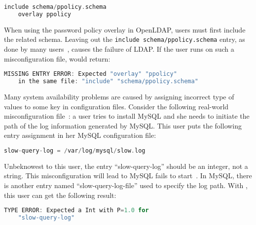 \begin{lstlisting}[language=C, xleftmargin=.01\textwidth]
    include schema/ppolicy.schema
    overlay ppolicy
\end{lstlisting} 

When using the password policy overlay in OpenLDAP, 
users must first include the related schema.
Leaving out the {\tt include schema/ppolicy.schema} entry, 
as done by many users~\cite{yin11anempirical}, 
causes the failure of LDAP. 
If the user runs \app on such a misconfiguration file,
\app would return:

\begin{lstlisting}[language=C, xleftmargin=.01\textwidth]
    MISSING ENTRY ERROR: Expected "overlay" "ppolicy"
    in the same file: "include" "schema/ppolicy.schema"
\end{lstlisting} 

Many system availability problems are caused by 
assigning incorrect type of values to some key in configuration
files. Consider the following real-world misconfiguration
file~\cite{typeerror}: 
a user tries to install MySQL and she needs to initiate the path
of the log information generated by MySQL.
This user puts the following entry assignment in her MySQL
configuration file: 

\begin{lstlisting}[language=C, xleftmargin=.01\textwidth]
    slow-query-log = /var/log/mysql/slow.log
\end{lstlisting} 

Unbeknowest to this user, the entry ``slow-query-log'' should be an 
integer, not a string. This misconfiguration will lead to 
MySQL fails to start~\cite{querylog}. In MySQL, there is another entry 
named ``slow-query-log-file'' used to specify the log path.
With \app, this user can get the following result:

\begin{lstlisting}[language=C, xleftmargin=.01\textwidth]
    TYPE ERROR: Expected a Int with P=1.0 for
    "slow-query-log"
\end{lstlisting} 

